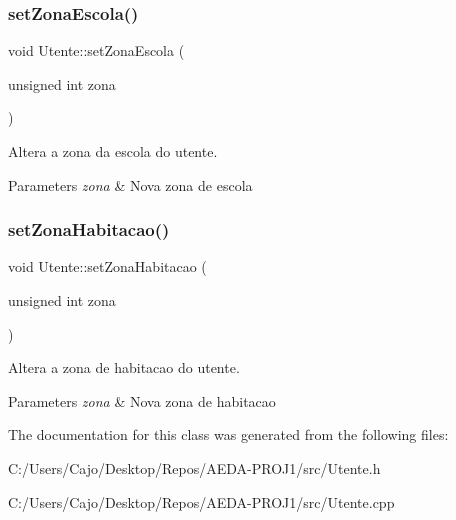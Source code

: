 \subsubsection{\texorpdfstring{set\+Zona\+Escola()}{setZonaEscola()}}
{\footnotesize\ttfamily void Utente\+::set\+Zona\+Escola (\begin{DoxyParamCaption}\item[{unsigned int}]{zona }\end{DoxyParamCaption})}



Altera a zona da escola do utente. 


\begin{DoxyParams}{Parameters}
{\em zona} & Nova zona de escola \\
\hline
\end{DoxyParams}
\mbox{\label{class_utente_a7276cad0368359751b7aad74ed305806}} 
\subsubsection{\texorpdfstring{set\+Zona\+Habitacao()}{setZonaHabitacao()}}
{\footnotesize\ttfamily void Utente\+::set\+Zona\+Habitacao (\begin{DoxyParamCaption}\item[{unsigned int}]{zona }\end{DoxyParamCaption})}



Altera a zona de habitacao do utente. 


\begin{DoxyParams}{Parameters}
{\em zona} & Nova zona de habitacao \\
\hline
\end{DoxyParams}


The documentation for this class was generated from the following files\+:\begin{DoxyCompactItemize}
\item 
C\+:/\+Users/\+Cajo/\+Desktop/\+Repos/\+A\+E\+D\+A-\/\+P\+R\+O\+J1/src/Utente.\+h\item 
C\+:/\+Users/\+Cajo/\+Desktop/\+Repos/\+A\+E\+D\+A-\/\+P\+R\+O\+J1/src/Utente.\+cpp\end{DoxyCompactItemize}
